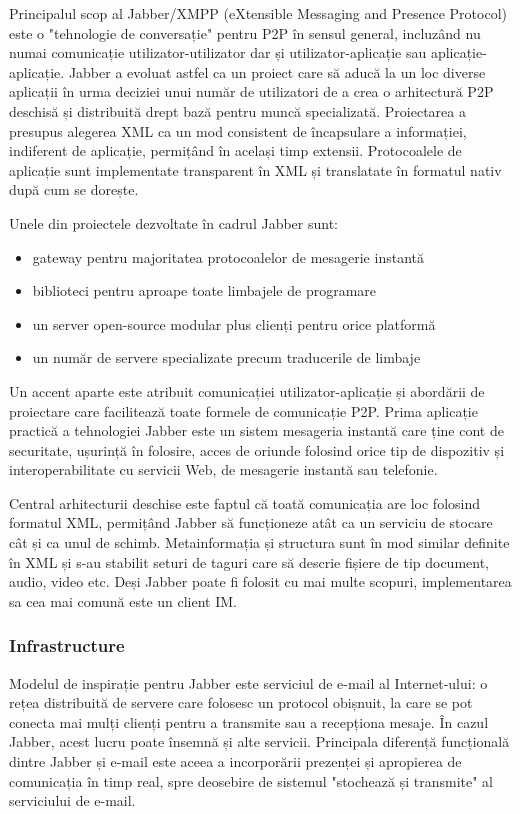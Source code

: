 Principalul scop al Jabber/XMPP (eXtensible Messaging and Presence Protocol)
este o "tehnologie de conversație" pentru P2P în sensul general, incluzând nu
numai comunicație utilizator-utilizator dar și utilizator-aplicație sau
aplicație-aplicație. Jabber a evoluat astfel ca un proiect care să aducă la un
loc diverse aplicații în urma deciziei unui număr de utilizatori de a crea o
arhitectură P2P deschisă și distribuită drept bază pentru muncă specializată.
Proiectarea a presupus alegerea XML ca un mod consistent de încapsulare a
informației, indiferent de aplicație, permițând în același timp extensii.
Protocoalele de aplicație sunt implementate transparent în XML și translatate
în formatul nativ după cum se dorește.

Unele din proiectele dezvoltate în cadrul Jabber sunt:
\begin{itemize}
  \item gateway pentru majoritatea protocoalelor de mesagerie instantă
  \item biblioteci pentru aproape toate limbajele de programare
  \item un server open-source modular plus clienți pentru orice platformă
  \item un număr de servere specializate precum traducerile de limbaje
\end{itemize}

Un accent aparte este atribuit comunicației utilizator-aplicație și abordării
de proiectare care facilitează toate formele de comunicație P2P. Prima
aplicație practică a tehnologiei Jabber este un sistem mesageria instantă care
ține cont de securitate, ușurință în folosire, acces de oriunde folosind orice
tip de dispozitiv și interoperabilitate cu servicii Web, de mesagerie instantă
sau telefonie.

Central arhitecturii deschise este faptul că toată comunicația are loc
folosind formatul XML, permițând Jabber să funcționeze atât ca un serviciu de
stocare cât și ca unul de schimb. Metainformația și structura sunt în mod
similar definite în XML și s-au stabilit seturi de taguri care să descrie
fișiere de tip document, audio, video etc. Deși Jabber poate fi folosit cu mai
multe scopuri, implementarea sa cea mai comună este un client IM.

\subsubsection{Infrastructure}

Modelul de inspirație pentru Jabber este serviciul de e-mail al Internet-ului:
o rețea distribuită de servere care folosesc un protocol obișnuit, la care se
pot conecta mai mulți clienți pentru a transmite sau a recepționa mesaje. În
cazul Jabber, acest lucru poate însemnă și alte servicii. Principala diferență
funcțională dintre Jabber și e-mail este aceea a incorporării prezenței și
apropierea de comunicația în timp real, spre deosebire de sistemul "stochează
și transmite" al serviciului de e-mail.

